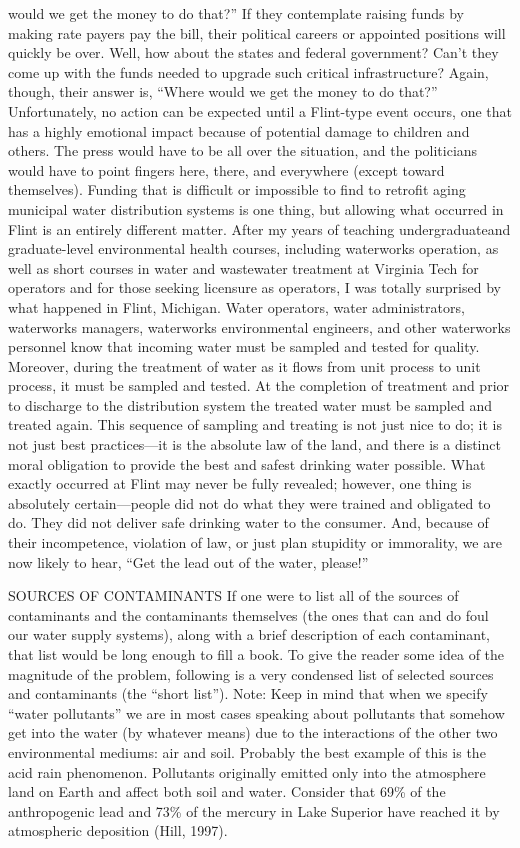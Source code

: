 \documentclass{article}
\begin{document}
would we get the money to do that?'' If they contemplate raising funds
by making rate payers pay the bill, their political careers or appointed
positions will quickly be over. Well, how about the states and federal
government? Can't they come up with the funds needed to upgrade such
critical infrastructure? Again, though, their answer is, ``Where would
we get the money to do that?'' Unfortunately, no action can be expected
until a Flint-type event occurs, one that has a highly emotional impact
because of potential damage to children and others. The press would have
to be all over the situation, and the politicians would have to point
fingers here, there, and everywhere (except toward themselves). Funding
that is difficult or impossible to find to retrofit aging municipal
water distribution systems is one thing, but allowing what occurred in
Flint is an entirely different matter. After my years of teaching
undergraduateand graduate-level environmental health courses, including
waterworks operation, as well as short courses in water and wastewater
treatment at Virginia Tech for operators and for those seeking licensure
as operators, I was totally surprised by what happened in Flint,
Michigan. Water operators, water administrators, waterworks managers,
waterworks environmental engineers, and other waterworks personnel know
that incoming water must be sampled and tested for quality. Moreover,
during the treatment of water as it flows from unit process to unit
process, it must be sampled and tested. At the completion of treatment
and prior to discharge to the distribution system the treated water must
be sampled and treated again. This sequence of sampling and treating is
not just nice to do; it is not just best practices---it is the absolute
law of the land, and there is a distinct moral obligation to provide the
best and safest drinking water possible. What exactly occurred at Flint
may never be fully revealed; however, one thing is absolutely
certain---people did not do what they were trained and obligated to do.
They did not deliver safe drinking water to the consumer. And, because
of their incompetence, violation of law, or just plan stupidity or
immorality, we are now likely to hear, ``Get the lead out of the water,
please!''

SOURCES OF CONTAMINANTS If one were to list all of the sources of
contaminants and the contaminants themselves (the ones that can and do
foul our water supply systems), along with a brief description of each
contaminant, that list would be long enough to fill a book. To give the
reader some idea of the magnitude of the problem, following is a very
condensed list of selected sources and contaminants (the ``short
list''). Note: Keep in mind that when we specify ``water pollutants'' we
are in most cases speaking about pollutants that somehow get into the
water (by whatever means) due to the interactions of the other two
environmental mediums: air and soil. Probably the best example of this
is the acid rain phenomenon. Pollutants originally emitted only into the
atmosphere land on Earth and affect both soil and water. Consider that
69\% of the anthropogenic lead and 73\% of the mercury in Lake Superior
have reached it by atmospheric deposition (Hill, 1997).
\end{document}
